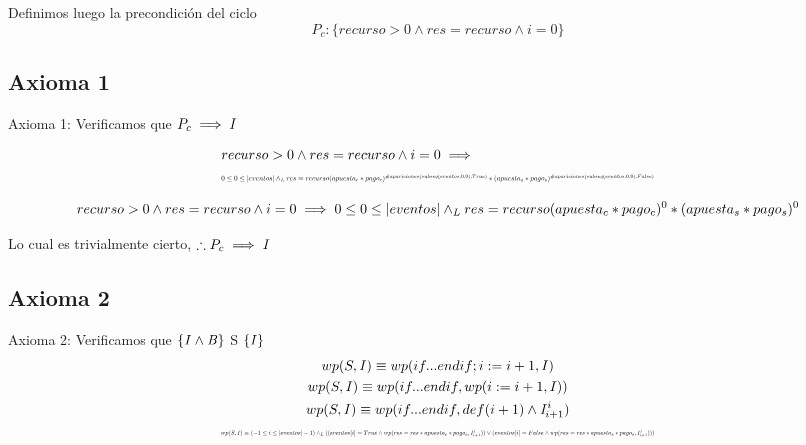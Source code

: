 \documentclass[10pt,a4paper]{article}
\begin{document}

\vspace{0.3cm}
Definimos luego la precondición del ciclo
\begin{equation}
    P_c:\{ recurso > 0 \land res=recurso \land i=0 \}
\end{equation}

\subsection{Axioma 1}
Axioma 1: Verificamos que $P_c \implies {\it I}$
\vspace{0.3cm}

\begin{equation}
    \begin{split}
        & recurso > 0 \land res=recurso \land i=0  \implies \\
        & \resizebox{.9\hsize}{!}{$0 \leq 0 \leq |eventos| \yLuego res = recurso(apuesta_c * pago_c)^{\#apariciones(subseq(eventos,0,0),True)}*(apuesta_s * pago_s)^{\#apariciones(subseq(eventos,0,0),False)}$}
    \end{split}
\end{equation}

\begin{equation}
    recurso > 0 \land res=recurso \land i=0 \implies 0 \leq 0 \leq |eventos| \land _L res = recurso(apuesta_c * pago_c)^0*(apuesta_s * pago_s)^0
\end{equation}

Lo cual es trivialmente cierto, $\therefore P_c \implies {\it I}$
\vspace{0.3cm}

\subsection{Axioma 2}
Axioma 2: Verificamos que $\{\it I \land B \}$ S $\{\it I \}$ \\

\begin{equation}
    \begin{gathered}
        wp(S,{\it I}) \equiv wp(if...endif; i:=i+1, I) \\
        wp(S,{\it I}) \equiv wp(if...endif, wp(i:=i+1, I)) \\
        wp(S,{\it I}) \equiv wp(if...endif, def(i+1) \land {\it I}_{i+1}^i)\\
        \resizebox{.9\hsize}{!}{$wp(S,{\it I})\equiv (-1 \leq i \leq |eventos| -1) \yLuego ((eventos[i]=True \land wp(res=res*apuesta_c*pago_c,{\it I}_{i+1}^i)) \lor (eventos[i]=False \land wp(res=res*apuesta_s*pago_s,{\it I}_{i+1}^i)))$}
    \end{gathered}
\end{equation}
\end{document}
